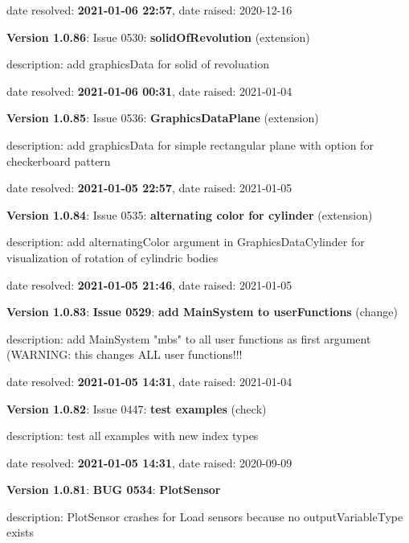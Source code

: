   \item   date resolved: {\bf 2021-01-06 22:57},
date raised: 2020-12-16   \ei
  \item {\bf Version 1.0.86}: \vspace{-6pt} 
  Issue 0530: {\bf solidOfRevolution}
(extension)
  \bi
  \item {\small description: add graphicsData for solid of revoluation}
  \item   date resolved: {\bf 2021-01-06 00:31},
date raised: 2021-01-04   \ei
  \item {\bf Version 1.0.85}: \vspace{-6pt} 
  Issue 0536: {\bf GraphicsDataPlane}
(extension)
  \bi
  \item {\small description: add graphicsData for simple rectangular plane with option for checkerboard pattern}
  \item   date resolved: {\bf 2021-01-05 22:57},
date raised: 2021-01-05   \ei
  \item {\bf Version 1.0.84}: \vspace{-6pt} 
  Issue 0535: {\bf alternating color for cylinder}
(extension)
  \bi
  \item {\small description: add alternatingColor argument in GraphicsDataCylinder for visualization of rotation of cylindric bodies}
  \item   date resolved: {\bf 2021-01-05 21:46},
date raised: 2021-01-05   \ei
  \item {\bf Version 1.0.83}: \vspace{-6pt} 
{\bf \color{warningRed}  Issue 0529}: {\bf add MainSystem to userFunctions}
(change)
  \bi
  \item {\small description: add MainSystem "mbs" to all user functions as first argument (WARNING: this changes ALL user functions!!!}
  \item   date resolved: {\bf 2021-01-05 14:31},
date raised: 2021-01-04   \ei
  \item {\bf Version 1.0.82}: \vspace{-6pt} 
  Issue 0447: {\bf test examples}
(check)
  \bi
  \item {\small description: test all examples with new index types}
  \item   date resolved: {\bf 2021-01-05 14:31},
date raised: 2020-09-09   \ei
  \item {\bf Version 1.0.81}: \vspace{-6pt} 
{\bf \color{warningRed}  BUG 0534}: {\bf PlotSensor}
  \bi
  \item {\small description: PlotSensor crashes for Load sensors because no outputVariableType exists}
